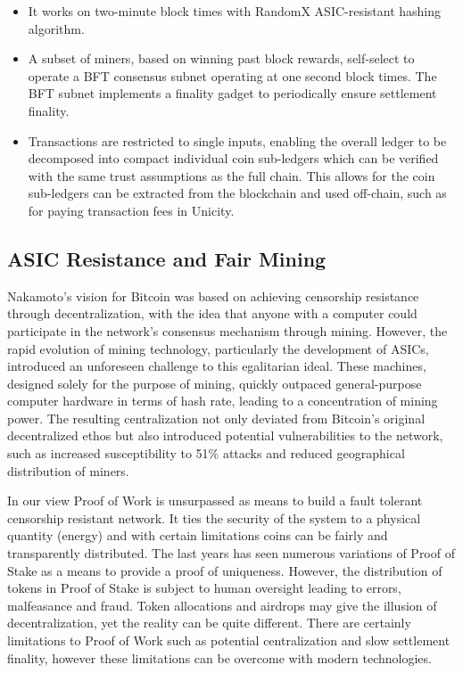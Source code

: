 \documentclass{article}
\begin{document}
\begin{itemize}
\setlength{\leftmargin}{1em}
 \item It works on two-minute block times with RandomX ASIC-resistant hashing algorithm. 
 \item A subset of miners, based on winning past block rewards, self-select to operate a BFT consensus subnet operating at one second block times. The BFT subnet implements a finality gadget to periodically ensure settlement finality.
 \item Transactions are restricted to single inputs, enabling the overall ledger to be decomposed into compact individual coin sub-ledgers which can be verified with the same trust assumptions as the full chain.  This allows for the coin sub-ledgers can be extracted from the blockchain and used off-chain, such as for paying transaction fees in Unicity. 
\end{itemize}




\subsection*{ASIC Resistance and Fair Mining}

Nakamoto's vision for Bitcoin was based on achieving censorship resistance through decentralization, with the idea that anyone with a computer could participate in the network's consensus mechanism through mining. However, the rapid evolution of mining technology, particularly the development of ASICs, introduced an unforeseen challenge to this egalitarian ideal. These machines, designed solely for the purpose of mining, quickly outpaced general-purpose computer hardware in terms of hash rate, leading to a concentration of mining power. The resulting centralization not only deviated from Bitcoin's original decentralized ethos but also introduced potential vulnerabilities to the network, such as increased susceptibility to 51\% attacks and reduced geographical distribution of miners. 

\vspace{2mm}

In our view Proof of Work is unsurpassed as means to build a fault tolerant censorship resistant network. It ties the security of the system to a physical quantity (energy) and with certain limitations coins can be fairly and transparently distributed. The last years has seen numerous variations of Proof of Stake as a means to provide a proof of uniqueness. However, the distribution of tokens in Proof of Stake is subject to human oversight leading to errors, malfeasance and fraud. Token allocations and airdrops may give the illusion of decentralization, yet the reality can be quite different. There are certainly limitations to Proof of Work such as potential centralization and slow settlement finality, however these limitations can be overcome with modern technologies. 
\end{document}
